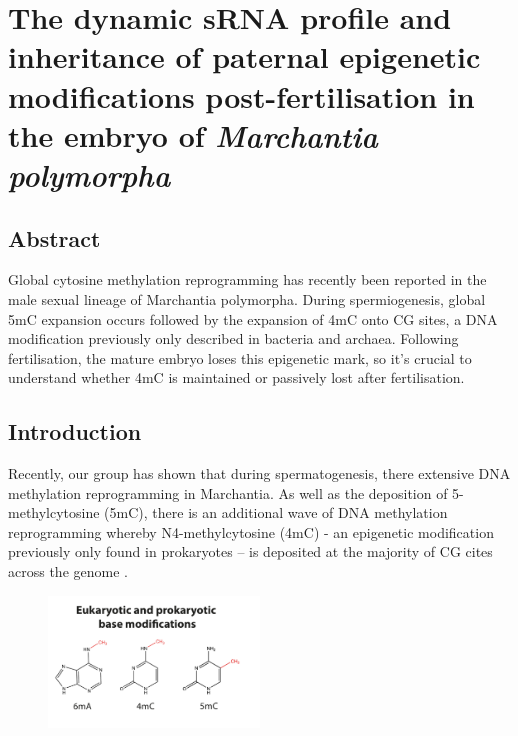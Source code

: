 \chapter{The dynamic sRNA profile and inheritance of paternal epigenetic modifications post-fertilisation in the embryo of \textit{Marchantia polymorpha}}

\ifpdf
    \graphicspath{{Chapter3/Figs/Raster/}{Chapter3/Figs/PDF/}{Chapter3/Figs/}}
\else
    \graphicspath{{Chapter3/Figs/Vector/}{Chapter3/Figs/}}
\fi


\section{Abstract}

Global cytosine methylation reprogramming has recently been reported in the male sexual lineage of Marchantia polymorpha. During spermiogenesis, global 5mC expansion occurs followed by the expansion of 4mC onto CG sites, a DNA modification previously only described in bacteria and archaea. Following fertilisation, the mature embryo loses this epigenetic mark, so it’s crucial to understand whether 4mC is maintained or passively lost after fertilisation.


\section{Introduction}

Recently, our group has shown that during spermatogenesis, there extensive DNA methylation reprogramming in Marchantia. As well as the deposition of 5-methylcytosine (5mC), there is an additional wave of DNA methylation reprogramming whereby N4-methylcytosine (4mC) - an epigenetic modification previously only found in prokaryotes – is deposited at the majority of CG cites across the genome \citep{RN189}. 

\begin{figure}[htbp!] 
\centering    
    \includegraphics[width=0.5\textwidth]{Chapter3/Figs/Intro/base_mods.pdf}
\caption{}
\label{fig:base_mods}
\captionsetup{font=small}
    \caption*{}
\end{figure}

